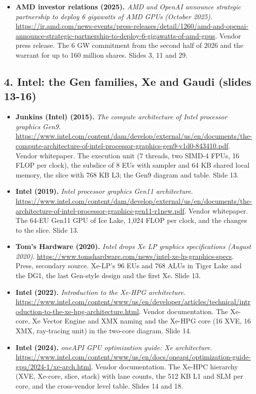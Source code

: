 \begin{itemize}[leftmargin=1.2em,itemsep=3pt]
\item \textbf{AMD investor relations (2025).} \textit{AMD and OpenAI announce strategic partnership to deploy 6 gigawatts of AMD GPUs (October 2025)}. \url{https://ir.amd.com/news-events/press-releases/detail/1260/amd-and-openai-announce-strategic-partnership-to-deploy-6-gigawatts-of-amd-gpus}. Vendor press release. The 6 GW commitment from the second half of 2026 and the warrant for up to 160 million shares. Slides 3, 11 and 29.
\end{itemize}
\subsection*{4. Intel: the Gen families, Xe and Gaudi (slides 13-16)}
\begin{itemize}[leftmargin=1.2em,itemsep=3pt]\sloppy
\item \textbf{Junkins (Intel) (2015).} \textit{The compute architecture of Intel processor graphics Gen9}. \url{https://www.intel.com/content/dam/develop/external/us/en/documents/the-compute-architecture-of-intel-processor-graphics-gen9-v1d0-843410.pdf}. Vendor whitepaper. The execution unit (7 threads, two SIMD-4 FPUs, 16 FLOP per clock), the subslice of 8 EUs with sampler and 64 KB shared local memory, the slice with 768 KB L3; the Gen9 diagram and table. Slide 13.
\item \textbf{Intel (2019).} \textit{Intel processor graphics Gen11 architecture}. \url{https://www.intel.com/content/dam/develop/external/us/en/documents/the-architecture-of-intel-processor-graphics-gen11-r1new.pdf}. Vendor whitepaper. The 64-EU Gen11 GPU of Ice Lake, 1,024 FLOP per clock, and the changes to the slice. Slide 13.
\item \textbf{Tom's Hardware (2020).} \textit{Intel drops Xe LP graphics specifications (August 2020)}. \url{https://www.tomshardware.com/news/intel-xe-lp-graphics-specs}. Press, secondary source. Xe-LP's 96 EUs and 768 ALUs in Tiger Lake and the DG1, the last Gen-style design and the first Xe. Slide 13.
\item \textbf{Intel (2022).} \textit{Introduction to the Xe-HPG architecture}. \url{https://www.intel.com/content/www/us/en/developer/articles/technical/introduction-to-the-xe-hpg-architecture.html}. Vendor documentation. The Xe-core, Xe Vector Engine and XMX naming and the Xe-HPG core (16 XVE, 16 XMX, ray-tracing unit) in the two-core diagram. Slide 14.
\item \textbf{Intel (2024).} \textit{oneAPI GPU optimization guide: Xe architecture}. \url{https://www.intel.com/content/www/us/en/docs/oneapi/optimization-guide-gpu/2024-1/xe-arch.html}. Vendor documentation. The Xe-HPC hierarchy (XVE, Xe-core, slice, stack) with lane counts, the 512 KB L1 and SLM per core, and the cross-vendor level table. Slides 14 and 18.

\end{itemize}
